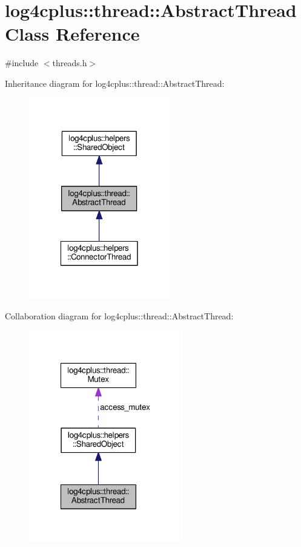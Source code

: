 \hypertarget{classlog4cplus_1_1thread_1_1AbstractThread}{\section{log4cplus\-:\-:thread\-:\-:Abstract\-Thread Class Reference}
\label{classlog4cplus_1_1thread_1_1AbstractThread}
}


{\ttfamily \#include $<$threads.\-h$>$}



Inheritance diagram for log4cplus\-:\-:thread\-:\-:Abstract\-Thread\-:
\nopagebreak
\begin{figure}[H]
\begin{center}
\leavevmode
\includegraphics[width=174pt]{classlog4cplus_1_1thread_1_1AbstractThread__inherit__graph}
\end{center}
\end{figure}


Collaboration diagram for log4cplus\-:\-:thread\-:\-:Abstract\-Thread\-:
\nopagebreak
\begin{figure}[H]
\begin{center}
\leavevmode
\includegraphics[width=190pt]{classlog4cplus_1_1thread_1_1AbstractThread__coll__graph}
\end{center}
\end{figure}
